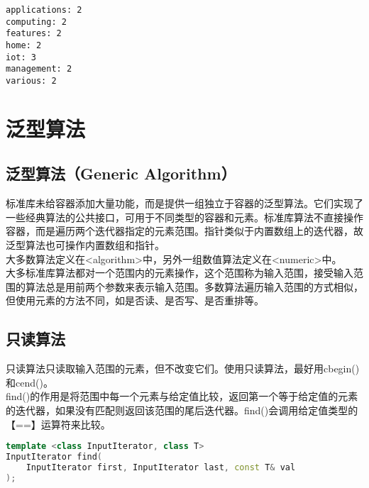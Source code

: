 \begin{tcolorbox}
	\begin{verbatim}
applications: 2
computing: 2
features: 2
home: 2
iot: 3
management: 2
various: 2
	\end{verbatim}
\end{tcolorbox}

\newpage

\section{泛型算法}

\subsection{泛型算法（Generic Algorithm）}

标准库未给容器添加大量功能，而是提供一组独立于容器的泛型算法。它们实现了一些经典算法的公共接口，可用于不同类型的容器和元素。标准库算法不直接操作容器，而是遍历两个迭代器指定的元素范围。指针类似于内置数组上的迭代器，故泛型算法也可操作内置数组和指针。\\

大多数算法定义在<algorithm>中，另外一组数值算法定义在<numeric>中。\\

大多标准库算法都对一个范围内的元素操作，这个范围称为输入范围，接受输入范围的算法总是用前两个参数来表示输入范围。多数算法遍历输入范围的方式相似，但使用元素的方法不同，如是否读、是否写、是否重排等。\\

\subsection{只读算法}

只读算法只读取输入范围的元素，但不改变它们。使用只读算法，最好用cbegin()和cend()。\\

find()的作用是将范围中每一个元素与给定值比较，返回第一个等于给定值的元素的迭代器，如果没有匹配则返回该范围的尾后迭代器。find()会调用给定值类型的【==】运算符来比较。

\vspace{-0.5cm}

\begin{lstlisting}[language=C++]
template <class InputIterator, class T>
InputIterator find(
	InputIterator first, InputIterator last, const T& val
);
\end{lstlisting}

